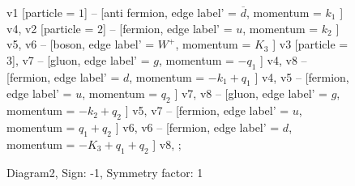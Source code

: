 \documentclass{revtex4}
\begin{document}
\begin{figure}[!htb]
\begin{center}
{    %
v1 [particle = \(1\)] -- [anti fermion, edge label' = \(\overline{d}\), momentum = \(k_{1}\) ] v4, 
v2 [particle = \(2\)] -- [fermion, edge label' = \(u\), momentum = \(k_{2}\) ] v5, 
v6 -- [boson, edge label' = \(W^{+}\), momentum = \(K_{3}\) ] v3 [particle = \(3\)], 
v7 -- [gluon, edge label' = \(g\), momentum = \(-q_{1}\) ] v4, 
v8 -- [fermion, edge label' = \(d\), momentum = \(-k_{1} + q_{1}\) ] v4, 
v5 -- [fermion, edge label' = \(u\), momentum = \(q_{2}\) ] v7, 
v8 -- [gluon, edge label' = \(g\), momentum = \(-k_{2} + q_{2}\) ] v5, 
v7 -- [fermion, edge label' = \(u\), momentum = \(q_{1} + q_{2}\) ] v6, 
v6 -- [fermion, edge label' = \(d\), momentum = \(-K_{3} + q_{1} + q_{2}\) ] v8, 
};
\end{center}
\caption{Diagram2, Sign: -1, Symmetry factor: 1}
\end{figure}
\newpage
\end{document}
